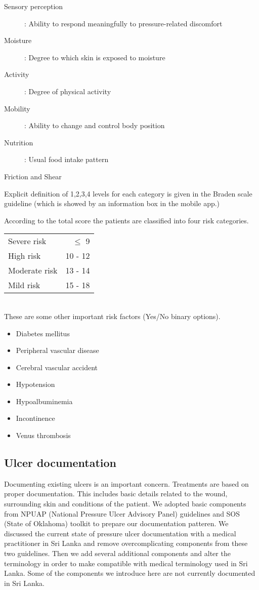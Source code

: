 \begin{description}
	\item[Sensory perception]: Ability to respond meaningfully to pressure-related discomfort 
	\item[Moisture]: Degree to which skin is exposed to moisture 
	\item[Activity]: Degree of physical	activity 
	\item[Mobility]: Ability to change and control body position
	\item[Nutrition]: Usual food intake 	pattern 
	\item[Friction and Shear]     
\end{description}

Explicit definition of 1,2,3,4 levels for each category is given in the Braden scale guideline (which is showed by an information box in the mobile app.)

According to the total score the patients are classified into four risk categories.


\begin{tabular}{l r}
	Severe risk &  $\leq$ 9\\
	High risk &  10 - 12\\
	Moderate risk & 13 - 14\\
	Mild risk &  15 - 18 \\
\end{tabular}\\

These are some other important risk factors (Yes/No binary options). 

\begin{itemize}
	\item Diabetes mellitus
	\item Peripheral vascular disease
	\item Cerebral vascular accident
	\item Hypotension
	\item Hypoalbuminemia
	\item Incontinence
	\item Venus thrombosis	
\end{itemize}


\subsection{Ulcer documentation}

Documenting existing ulcers is an important concern. Treatments are based on proper documentation. This includes basic details related to the wound, surrounding skin and conditions of the patient. We adopted basic components from NPUAP (National Pressure Ulcer Advisory Panel) guidelines and SOS (State of Oklahoma) toolkit to prepare our documentation patteren. We discussed the current state of pressure ulcer documentation with a medical practitioner in Sri Lanka and remove overcomplicating components from these two guidelines. Then we add several additional components and alter the terminology in order to make compatible with medical terminology used in Sri Lanka. Some of the components we introduce here are not currently documented in Sri Lanka. 


